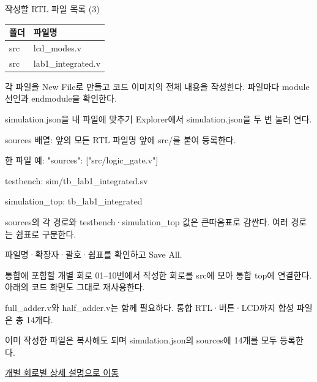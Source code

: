 \begin{frame}{작성할 RTL 파일 목록 (3)}\relax
\small
\begin{center}\renewcommand{\arraystretch}{1.45}
\begin{tabular}{l|l}
폴더 & 파일명\\\hline
src & lcd\_modes.v\\
src & lab1\_integrated.v\\
\end{tabular}\end{center}
각 파일을 New File로 만들고 코드 이미지의 전체 내용을 작성한다. 파일마다 module 선언과 endmodule을 확인한다.\par
\end{frame}

\begin{frame}{simulation.json을 내 파일에 맞추기}\relax
\small
Explorer에서 simulation.json을 두 번 눌러 연다.\par\vspace{0.22cm}sources 배열: 앞의 모든 RTL 파일명 앞에 src/를 붙여 등록한다.\par\vspace{0.22cm}한 파일 예: "sources": ["src/logic\_gate.v"]\par\vspace{0.22cm}testbench: sim/tb\_lab1\_integrated.sv\par\vspace{0.22cm}simulation\_top: tb\_lab1\_integrated\par\vspace{0.22cm}sources의 각 경로와 testbench·simulation\_top 값은 큰따옴표로 감싼다. 여러 경로는 쉼표로 구분한다.\par\vspace{0.22cm}파일명·확장자·괄호·쉼표를 확인하고 Save All.\par
\end{frame}

\begin{frame}{통합에 포함할 개별 회로}\relax
\small
01–10번에서 작성한 회로를 src에 모아 통합 top에 연결한다. 아래의 코드 화면도 그대로 재사용한다.\par\vspace{0.22cm}full\_adder.v와 half\_adder.v는 함께 필요하다. 통합 RTL·버튼·LCD까지 합성 파일은 총 14개다.\par\vspace{0.22cm}이미 작성한 파일은 복사해도 되며 simulation.json의 sources에 14개를 모두 등록한다.\par\href{04.LAB1_00_CONTENTS.pdf}{개별 회로별 상세 설명으로 이동}
\end{frame}

